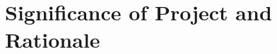 \documentclass[12pt]{article}
\begin{document}
\section{Significance of Project and Rationale}



	
\end{document}
